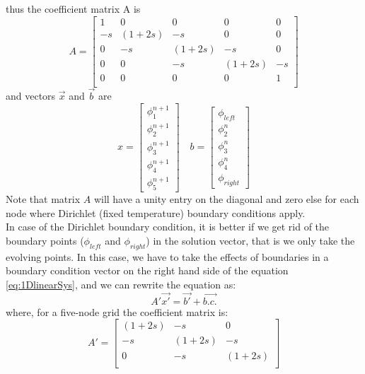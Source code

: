 thus the coefficient matrix A is
\begin{equation}
A = \begin{bmatrix}
       1 & 0 & 0 & 0 & 0 \\
	   -s & (1+2s) & -s & 0 & 0 \\
  	   0 & -s & (1+2s) & -s & 0  \\
  	   0 & 0 & -s & (1+2s) & -s  \\  	   
       0 & 0 & 0 & 0 & 1 \\
     \end{bmatrix}
\end{equation}
and vectors $\vec{x}$ and $\vec{b}$ are
\begin{equation}
x=\begin{bmatrix}
\phi^{n+1}_{1} \\ \phi^{n+1}_{2} \\ \phi^{n+1}_{3} \\ \phi^{n+1}_{4} \\ \phi^{n+1}_{5}
\end{bmatrix}
\quad
b=\begin{bmatrix}
\phi_{left} \\ \phi^{n}_{2} \\ \phi^{n}_{3} \\ \phi^{n}_{4} \\ \phi_{right}
\end{bmatrix}
\end{equation}
Note that matrix $A$ will have a unity entry on the diagonal and zero else for each node where Dirichlet (fixed temperature) boundary conditions apply.
\\
In case of the Dirichlet boundary condition, it is better if we get rid of the boundary points ($\phi_{left}$ and $\phi_{right}$) in the solution vector, that is we only take the evolving points. In this case, we have to take the effects of boundaries in a boundary condition vector on the right hand side of the equation \ref{eq:1DlinearSys}, and we can rewrite the equation as:
\begin{equation}
\label{eq:1DlinearSys+B.C.}
A'\vec{x'}=\vec{b'} + \vec{b.c.}
\end{equation} 
where, for a five-node grid the coefficient matrix is:
\begin{equation}
A' = \begin{bmatrix}
	   (1+2s) & -s & 0  \\
  	   -s & (1+2s) & -s \\
  	    0 & -s & (1+2s)   \\  	   
     \end{bmatrix}
\end{equation}
